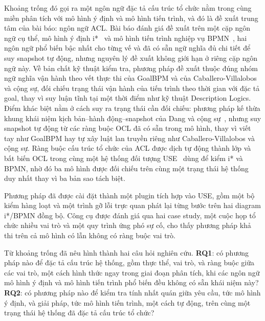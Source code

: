 Khoảng trống đó gọi ra một ngôn ngữ đặc tả cấu trúc tổ chức nằm trong cùng miền phân tích với mô
hình ý định và mô hình tiến trình, và đó là đề xuất trung tâm của bài báo: ngôn ngữ ACL. Bài báo
đánh giá đề xuất trên một cặp ngôn ngữ cụ thể, mô hình ý định i*~\cite{yu1997towards} và mô hình
tiến trình nghiệp vụ BPMN~\cite{omg2013bpmn}, hai ngôn ngữ phổ biến bậc nhất cho từng vế và đã có
sẵn ngữ nghĩa đủ chi tiết để suy snapshot tự động, nhưng nguyên lý đề xuất không giới hạn ở riêng
cặp ngôn ngữ này. Về bản chất kỹ thuật kiểm tra, phương pháp đề xuất thuộc đúng nhóm ngữ nghĩa vận
hành theo vết thực thi của GoalBPM và của Caballero-Villalobos và cộng sự, đối chiếu trạng thái vận
hành của tiến trình theo thời gian với đặc tả goal, thay vì suy luận tĩnh tại một thời điểm như kỹ
thuật Description Logics. Điểm khác biệt nằm ở cách suy ra trạng thái cần đối chiếu: phương pháp kế
thừa khung khái niệm kịch bản--hành động--snapshot của Dang và cộng sự~\cite{dang2010jucs}, nhưng
suy snapshot tự động từ các ràng buộc OCL đã có sẵn trong mô hình, thay vì viết tay như GoalBPM hay
tự xây luật lan truyền riêng như Caballero-Villalobos và cộng sự. Ràng buộc cấu trúc tổ chức của ACL
được dịch tự động thành lớp và bất biến OCL trong cùng một hệ thống đối tượng
USE~\cite{gogolla2007use} dùng để kiểm i* và BPMN, nhờ đó ba mô hình được đối chiếu trên cùng một
trạng thái hệ thống duy nhất thay vì ba bản sao tách biệt.

Phương pháp đã được cài đặt thành một plugin tích hợp vào USE, gồm một bộ kiểm hàng loạt và một
trình gỡ lỗi trực quan phát lại từng bước trên hai diagram i*/BPMN đồng bộ. Công cụ được đánh giá
qua hai case study, một cuộc họp tổ chức nhiều vai trò và một quy trình ứng phó sự cố, cho thấy
phương pháp khả thi trên cả mô hình có lẫn không có ràng buộc vai trò.

Từ khoảng trống đã nêu hình thành hai câu hỏi nghiên cứu. \textbf{RQ1}: có phương pháp nào để đặc tả
cấu trúc hệ thống, gồm thực thể, vai trò, và ràng buộc giữa các vai trò, một cách hình thức ngay
trong giai đoạn phân tích, khi các ngôn ngữ mô hình ý định và mô hình tiến trình phổ biến đều không
có sẵn khái niệm này? \textbf{RQ2}: có phương pháp nào để kiểm tra tính nhất quán giữa yêu cầu, tức
mô hình ý định, và giải pháp, tức mô hình tiến trình, một cách tự động, trên cùng một trạng thái hệ
thống đã đặc tả cấu trúc tổ chức?

